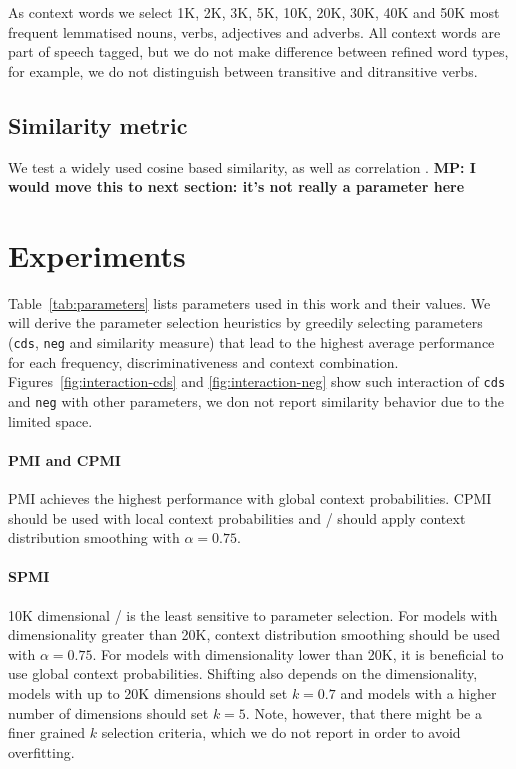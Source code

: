 \documentclass[11pt]{article}
\begin{document}
As context words we select 1K, 2K, 3K, 5K, 10K, 20K, 30K, 40K and 50K most frequent lemmatised nouns, verbs, adjectives and adverbs. All context words are part of speech tagged, but we do not make difference between refined word types, for example, we do not distinguish between transitive and ditransitive verbs.

\subsection{Similarity metric}
\label{sec:similarity-metric}

We test a widely used cosine based similarity, as well as correlation \cite{kiela-clark:2014:CVSC}. \textbf{MP: I would move this to next section: it's not really a parameter here}

\section{Experiments}
\label{sec:lexical-experiments}

Table~\ref{tab:parameters} lists parameters used in this work and their values. We will derive the parameter selection heuristics by greedily selecting parameters (\texttt{cds}, \texttt{neg} and similarity measure) that lead to the highest average performance for each frequency, discriminativeness and context combination. Figures~\ref{fig:interaction-cds} and \ref{fig:interaction-neg} show such interaction of \texttt{cds} and \texttt{neg} with other parameters, we don not report similarity behavior due to the limited space.

\paragraph{PMI and CPMI}

PMI achieves the highest performance with global context probabilities. CPMI should be used with local context probabilities and \CPMI/ should apply context distribution smoothing with $\alpha = 0.75$.

\paragraph{SPMI}

10K dimensional \SPMI/ is the least sensitive to parameter selection. For models with dimensionality greater than 20K, context distribution smoothing should be used with $\alpha = 0.75$. For models with dimensionality lower than 20K, it is beneficial to use global context probabilities. Shifting also depends on the dimensionality, models with up to 20K dimensions should set $k = 0.7$ and models with a higher number of dimensions should set $k = 5$. Note, however, that there might be a finer grained $k$ selection criteria, which we do not report in order to avoid overfitting.
\end{document}
